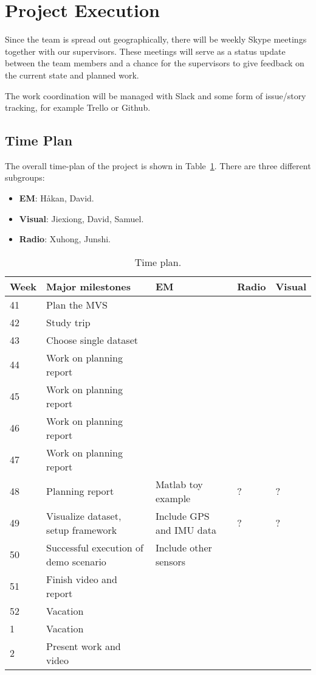 \section{Project Execution}

Since the team is spread out geographically, there will be weekly Skype meetings together with our supervisors. These meetings will serve as a status update between the team members and a chance for the supervisors to give feedback on the current state and planned work.

The work coordination will be managed with Slack and some form of
issue/story tracking, for example Trello or Github.

\subsection{Time Plan}
The overall time-plan of the project is shown in Table~\ref{tab:1}. There are three different
subgroups:
\begin{itemize}
\item \textbf{EM}: H\aa kan, David.
\item \textbf{Visual}: Jiexiong, David, Samuel.
\item \textbf{Radio}: Xuhong, Junshi.
\end{itemize}

\begin{table}[t]
  \centering
    \caption{Time plan.}\label{tab:1}
    \begin{tabular}{ p{} | p{} | p{} | p{} |p{}}
    \hline
    \textbf{Week} & \textbf{Major milestones}
      & \textbf{EM }  & \textbf{Radio} & \textbf{Visual} \\
      \hline
    41 & Plan the \gls{MVS} \\ \hline
    42 & Study trip \\ \hline
    43 & Choose single dataset \\ \hline
    44 & Work on planning report  \\ \hline
    45 & Work on planning report  \\ \hline
    46 & Work on planning report  \\ \hline
      47 & Work on planning report  \\ \hline
      48 & Planning report & Matlab toy example & ? & ? \\
      \hline
    49 & Visualize dataset, setup framework &  Include GPS and IMU
                                              data & ? & ?\\
      \hline
    50 & Successful execution of demo scenario & Include other sensors
      \\
      \hline
      51 & Finish video and report \\
      \hline
      52 & Vacation \\
      \hline
      1 & Vacation \\
      \hline
    2 & Present work and video\\
    \hline
  \end{tabular}
\end{table}

\newpage



